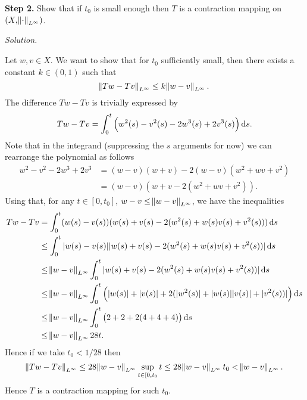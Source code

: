 \documentclass{article}
\begin{document}
\newpage

\textbf{Step 2.}
Show that if $t_0$ is small enough then $T$ is a contraction mapping on
$(X, \norm{\cdot}_{L^\infty})$.

\textit{Solution.}

Let $w, v \in X$. We want to show that for $t_0$ sufficiently small,
then there exists a constant $k \in (0, 1)$ such that
%
\begin{equation*}
    \norm{Tw - Tv}_{L^\infty} \leq k \norm{w - v}_{L^\infty}
    .
\end{equation*}
%
The difference $Tw - Tv$ is trivially expressed by
%
\begin{equation*}
    Tw - Tv = \int_0^{t} \del{w^2(s) - v^2(s) - 2 w^3(s) + 2 v^3(s)} \dif s
    .
\end{equation*}
%
Note that in the integrand (suppressing the $s$ arguments for now) we can
rearrange the polynomial as follows
%
\begin{align*}
    w^2 - v^2 - 2 w^3 + 2 v^3
        &= (w - v) (w + v) - 2 (w - v) (w^2 + w v + v^2) \\
        &= (w - v) (w + v - 2 (w^2 + w v + v^2))
        .
\end{align*}
%
Using that, for any $t \in [0, t_0]$, $w - v \leq \norm{w -
v}_{L^\infty}$, we have the inequalities
%
\begin{align*}
    Tw - Tv
        &= \int_0^{t} (w(s) - v(s)) (w(s) + v(s) - 2 (w^2(s) + w(s) v(s) + v^2(s))) \dif s \\
        &\leq \int_0^{t} |w(s) - v(s)| |w(s) + v(s) - 2 (w^2(s) + w(s) v(s) + v^2(s))| \dif s \\
        &\leq \norm{w - v}_{L^\infty} \int_0^{t} |w(s) + v(s) - 2 (w^2(s) + w(s) v(s) + v^2(s))| \dif s \\
        &\leq \norm{w - v}_{L^\infty} \int_0^{t} \del{|w(s)| + |v(s)| + 2 (|w^2(s)| + |w(s)| |v(s)| + |v^2(s))|} \dif s \\
        &\leq \norm{w - v}_{L^\infty} \int_0^{t} \del{2 + 2 + 2 (4 + 4 + 4)} \dif s \\
        &\leq \norm{w - v}_{L^\infty} 28 t
        .
\end{align*}
%
Hence if we take $t_0 < 1 / 28$ then
%
\begin{equation*}
    \norm{Tw - Tv}_{L^\infty}
        \leq 28 \norm{w - v}_{L^\infty} \sup_{t \in [0, t_0} t
        \leq 28 \norm{w - v}_{L^\infty} t_0
        < \norm{w - v}_{L^\infty}
        .
\end{equation*}
%
Hence $T$ is a contraction mapping for such $t_0$.
\end{document}
